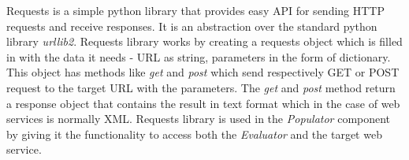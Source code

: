 Requests is a simple python library that provides easy API for sending HTTP requests and receive responses. It is an
abstraction over the standard python library \textit{urllib2}. Requests library works by creating a requests object
which is filled in with the data it needs - URL as string, parameters in the form of dictionary. This object has methods like \textit{get} and \textit{post}
which send respectively GET or POST request to the target URL with the parameters. The \textit{get} and \textit{post} method return a
response object that contains the result in text format which in the case of web services is normally XML. Requests library
is used in the \textit{Populator} component by giving it the functionality to access both the \textit{Evaluator} and the
target web service.